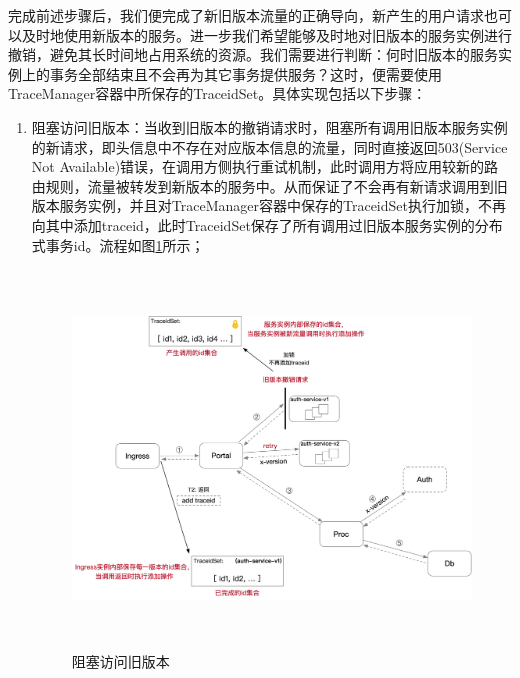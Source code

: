 \documentclass[a4paper]{article}
\theoremstyle{definition}
\begin{document}
完成前述步骤后，我们便完成了新旧版本流量的正确导向，新产生的用户请求也可以及时地使用新版本的服务。进一步我们希望能够及时地对旧版本的服务实例进行撤销，避免其长时间地占用系统的资源。我们需要进行判断：何时旧版本的服务实例上的事务全部结束且不会再为其它事务提供服务？这时，便需要使用TraceManager容器中所保存的TraceidSet。具体实现包括以下步骤：
\begin{enumerate}
	\item 阻塞访问旧版本：当收到旧版本的撤销请求时，阻塞所有调用旧版本服务实例的新请求，即头信息中不存在对应版本信息的流量，同时直接返回503(Service Not Available)错误，在调用方侧执行重试机制，此时调用方将应用较新的路由规则，流量被转发到新版本的服务中。从而保证了不会再有新请求调用到旧版本服务实例，并且对TraceManager容器中保存的TraceidSet执行加锁，不再向其中添加traceid，此时TraceidSet保存了所有调用过旧版本服务实例的分布式事务id。流程如图\ref{fig:block_and_retry}所示；
	\begin{figure}[!ht]
	 \centering
	 \includegraphics[height=10cm]{images/block_and_retry.png}
	 \caption{阻塞访问旧版本}
	 \label{fig:block_and_retry}
	\end{figure}


\end{enumerate}
\end{document}
